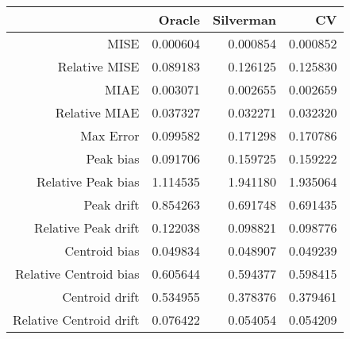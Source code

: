 \begin{tabular}{rrrr}
  \hline
 & Oracle & Silverman & CV \\ 
  \hline
MISE & 0.000604 & 0.000854 & 0.000852 \\ 
  Relative MISE & 0.089183 & 0.126125 & 0.125830 \\ 
  MIAE & 0.003071 & 0.002655 & 0.002659 \\ 
  Relative MIAE & 0.037327 & 0.032271 & 0.032320 \\ 
  Max Error & 0.099582 & 0.171298 & 0.170786 \\ 
  Peak bias & 0.091706 & 0.159725 & 0.159222 \\ 
  Relative Peak bias & 1.114535 & 1.941180 & 1.935064 \\ 
  Peak drift & 0.854263 & 0.691748 & 0.691435 \\ 
  Relative Peak drift & 0.122038 & 0.098821 & 0.098776 \\ 
  Centroid bias & 0.049834 & 0.048907 & 0.049239 \\ 
  Relative Centroid bias & 0.605644 & 0.594377 & 0.598415 \\ 
  Centroid drift & 0.534955 & 0.378376 & 0.379461 \\ 
  Relative Centroid drift & 0.076422 & 0.054054 & 0.054209 \\ 
   \hline
\end{tabular}
